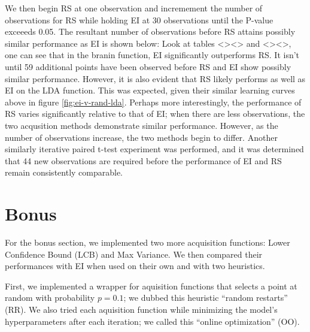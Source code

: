 \documentclass[11pt]{article}
\numberwithin{equation}{section}
\begin{document}


We then begin RS at one observation and incremement the number of observations for RS while holding EI at 30 observations until the P-value exceeeds 0.05.
The resultant number of observations before RS attains possibly similar performance as EI is shown below:
Look at tables <><> and <><>, one can see that in the branin function, EI significantly outperforms RS. 
It isn't until 59 additional points have been observed before RS and EI show possibly similar performance.
However, it is also evident that RS likely performs as well as EI on the LDA function. This was expected, given their similar learning curves above in figure \ref{fig:ei-v-rand-lda}.
Perhaps more interestingly, the performance of RS varies significantly relative to that of EI; when there are less observations, the two acqusition methods demonstrate similar performance. 
However, as the number of observations increase, the two methods begin to differ. 
Another similarly iterative paired t-test experiment was performed, and it was determined that 44 new observations are required before the performance of EI and RS remain consistently comparable.

\section*{Bonus}
For the bonus section, we implemented two more acquisition functions: Lower
Confidence Bound (LCB) and Max Variance. We then compared their performances
with EI when used on their own and with two heuristics.

First, we implemented a wrapper for aquisition functions that selects a point
at random with probability $p = 0.1$; we dubbed this heuristic ``random
restarts'' (RR). We also tried each aquisition function while minimizing the
model's hyperparameters after each iteration; we called this ``online
optimization'' (OO). 
\end{document}
